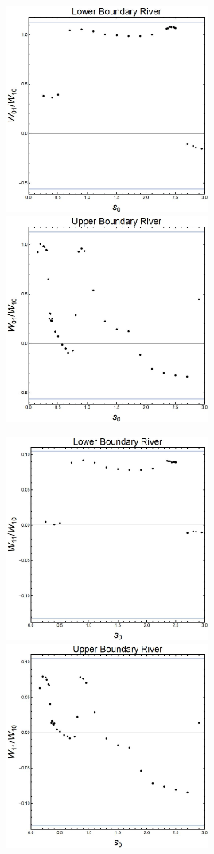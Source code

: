 ﻿\documentclass[12pt,a4paper]{article}
\begin{document}
\begin{figure}[H]
    \centering
   {{\includegraphics[width=6.7cm]{L01.jpg} }}
  {{\includegraphics[width=6.7cm]{U01.jpg} }}
\end{figure}

\begin{figure}[H]
    \centering
   {{\includegraphics[width=6.7cm]{L11.jpg} }}
  {{\includegraphics[width=6.7cm]{U11.jpg} }}
\end{figure}
\end{document}
